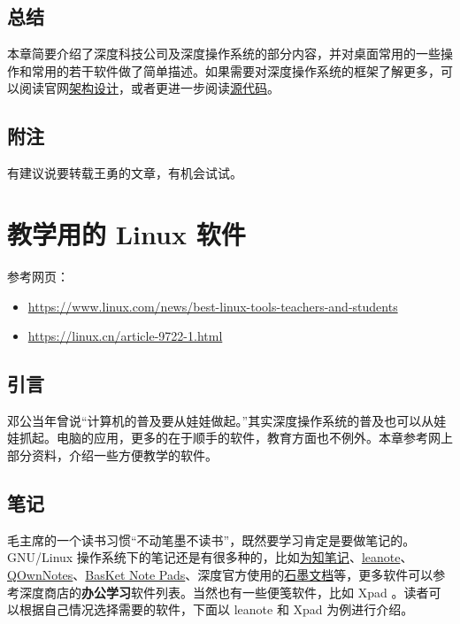 \documentclass[doctor,openright,twoside]{sjtuthesis}
\providecommand{\tightlist}{%
    \setlength{\itemsep}{0pt}\setlength{\parskip}{0pt}}
\theoremstyle{plain}
\theoremstyle{definition}
\theoremstyle{remark}
\theoremstyle{ocrenumbox}
\theoremstyle{plain}
\begin{document}
\hypertarget{section-34}{%
\section{总结}\label{section-34}}

本章简要介绍了深度科技公司及深度操作系统的部分内容，并对桌面常用的一些操作和常用的若干软件做了简单描述。如果需要对深度操作系统的框架了解更多，可以阅读官网\href{https://www.deepin.org/developer-community/architectural-design/}{架构设计}，或者更进一步阅读\href{https://github.com/linuxdeepin}{源代码}。

\hypertarget{section-35}{%
\section{附注}\label{section-35}}

有建议说要转载王勇的文章，有机会试试。

\hypertarget{chap:education-intro}{%
\chapter{教学用的 Linux 软件}\label{chap:education-intro}}

参考网页：

\begin{itemize}
\tightlist
\item
  \url{https://www.linux.com/news/best-linux-tools-teachers-and-students}
\item
  \url{https://linux.cn/article-9722-1.html}
\end{itemize}

\hypertarget{section-36}{%
\section{引言}\label{section-36}}

邓公当年曾说``计算机的普及要从娃娃做起。''其实深度操作系统的普及也可以从娃娃抓起。电脑的应用，更多的在于顺手的软件，教育方面也不例外。本章参考网上部分资料，介绍一些方便教学的软件。

\hypertarget{section-37}{%
\section{笔记}\label{section-37}}

毛主席的一个读书习惯``不动笔墨不读书''，既然要学习肯定是要做笔记的。GNU/Linux 操作系统下的笔记还是有很多种的，比如\href{http://www.wiz.cn/}{为知笔记}、\href{http://leanote.org/}{leanote}、\href{http://www.qownnotes.org/}{QOwnNotes}、\href{http://basket.kde.org}{BasKet Note Pads}、深度官方使用的\href{https://shimo.im/}{石墨文档}等，更多软件可以参考深度商店的\textbf{办公学习}软件列表。当然也有一些便笺软件，比如 Xpad 。读者可以根据自己情况选择需要的软件，下面以 leanote 和 Xpad 为例进行介绍。
\end{document}
